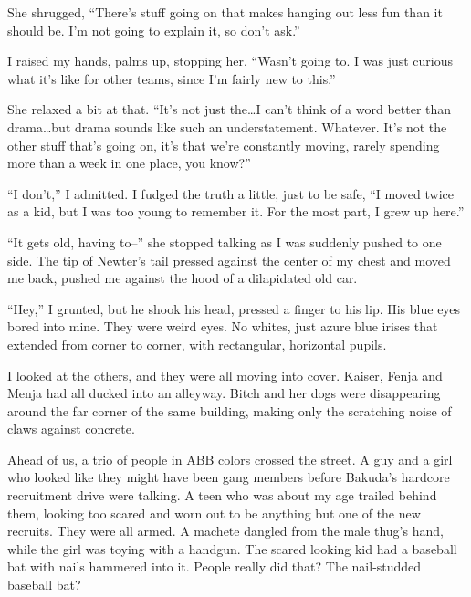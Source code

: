 She shrugged, ``There's stuff going on that makes hanging out less fun than it should be.  I'm not going to explain it, so don't ask.''



I raised my hands, palms up, stopping her, ``Wasn't going to.  I was just curious what it's like for other teams, since I'm fairly new to this.''



She relaxed a bit at that.  ``It's not just the\ldots I can't think of a word better than drama\ldots but drama sounds like such an understatement.  Whatever.  It's not the other stuff that's going on, it's that we're constantly moving, rarely spending more than a week in one place, you know?''



``I don't,'' I admitted.  I fudged the truth a little, just to be safe, ``I moved twice as a kid, but I was too young to remember it.  For the most part, I grew up here.''



``It gets old, having to--'' she stopped talking as I was suddenly pushed to one side.  The tip of Newter's tail pressed against the center of my chest and moved me back, pushed me against the hood of a dilapidated old car.



``Hey,'' I grunted, but he shook his head, pressed a finger to his lip.  His blue eyes bored into mine.  They were weird eyes.  No whites, just azure blue irises that extended from corner to corner, with rectangular, horizontal pupils.



I looked at the others, and they were all moving into cover.  Kaiser, Fenja and Menja had all ducked into an alleyway.  Bitch and her dogs were disappearing around the far corner of the same building, making only the scratching noise of claws against concrete.



Ahead of us, a trio of people in ABB colors crossed the street.  A guy and a girl who looked like they might have been gang members before Bakuda's hardcore recruitment drive were talking.  A teen who was about my age trailed behind them, looking too scared and worn out to be anything but one of the new recruits.  They were all armed.  A machete dangled from the male thug's hand, while the girl was toying with a handgun.  The scared looking kid had a baseball bat with nails hammered into it.  People really did that?  The nail-studded baseball bat?



